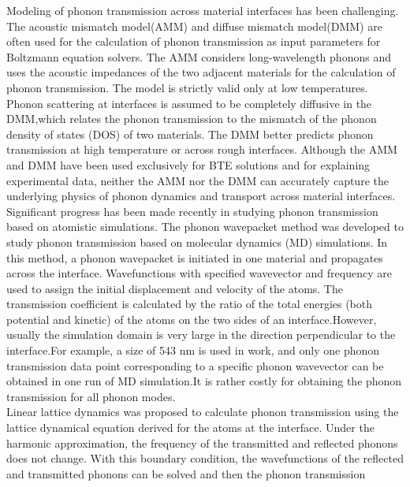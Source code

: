 \indent Modeling of phonon transmission across material interfaces has been challenging. The acoustic mismatch model(AMM) and diffuse mismatch model(DMM) are often used for the calculation of phonon transmission as input parameters for Boltzmann equation solvers\cite{DMM}.
The AMM considers long-wavelength phonons and uses the acoustic impedances of the two adjacent materials for the calculation of phonon transmission. The model is strictly valid only at low temperatures. Phonon scattering at interfaces is assumed to be completely diffusive in the DMM\cite{DMM},which relates the
phonon transmission to the mismatch of the phonon density
of states (DOS) of two materials. The DMM better predicts
phonon transmission at high temperature or across rough
interfaces. Although the AMM and DMM have been used
exclusively for BTE solutions and for explaining experimental
data, neither the AMM nor the DMM can accurately capture
the underlying physics of phonon dynamics and transport
across material interfaces.\\
\indent Significant progress has been made recently in studying	phonon transmission based on atomistic simulations. The
phonon wavepacket method\cite{schelling2002phonon} was developed to study
phonon transmission based on molecular dynamics (MD)
simulations. In this method, a phonon wavepacket is
initiated in one material and propagates across the interface.
Wavefunctions with specified wavevector and frequency are
used to assign the initial displacement and velocity of the
atoms. The transmission coefficient is calculated by the
ratio of the total energies (both potential and kinetic) of
the atoms on the two sides of an interface.However, usually the
simulation domain is very large in the direction perpendicular
to the interface\cite{schelling2002phonon,sun2010molecular}.For example, a size of 543 nm
is used in work\cite{schelling2002phonon}, and only one phonon transmission data
point corresponding to a specific phonon wavevector can be
obtained in one run of MD simulation.It is rather costly for obtaining the phonon transmission for all phonon modes.\\
\indent Linear lattice dynamics\cite{stoner1992measurements,zhao2005lattice} was proposed to
calculate phonon transmission using the lattice dynamical
equation derived for the atoms at the interface. Under the
harmonic approximation, the frequency of the transmitted
and reflected phonons does not change. With this boundary
condition, the wavefunctions of the reflected and transmitted
phonons can be solved and then the phonon transmission
